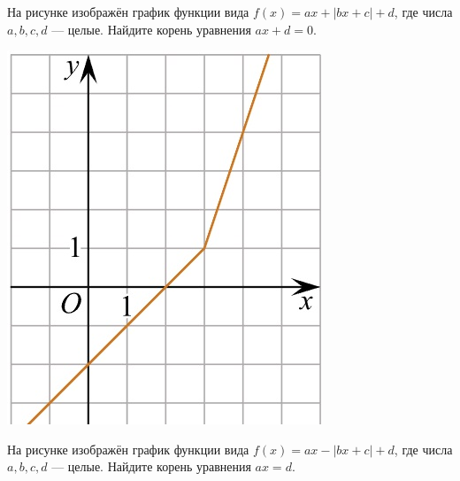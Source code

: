 	\begin{class}[number=6]
		\begin{listofex}
			\item
			\begin{minipage}[t]{0.43\textwidth}
				На рисунке изображён график функции вида \(f(x)=ax+|bx+c|+d\), где числа \(a, b, c, d\) --- целые. Найдите корень уравнения \(ax+d=0\).
			\end{minipage}
			\begin{minipage}[c]{0.1\textwidth}
				\includegraphics[align=t, width=\textwidth]{../../pics/G101M4C5-8.jpg}
			\end{minipage}
			\item
			\begin{minipage}[t]{0.43\textwidth}
				На рисунке изображён график функции вида \(f(x)=ax-|bx+c|+d\), где числа \(a, b, c, d\) --- целые. Найдите корень уравнения \(ax=d\).
			\end{minipage}
			\begin{minipage}[c]{0.1\textwidth}

\end{minipage}
\end{listofex}
\end{class}
